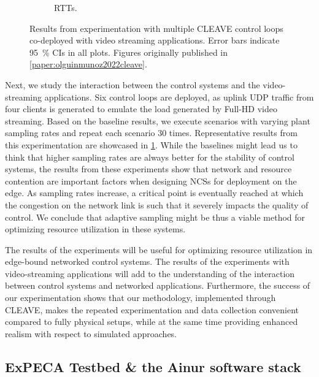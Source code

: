 \begin{figure}[t]
\begin{subfigure}[t]{.45\textwidth}
        \caption{\glspl{RTT}.}%
    \end{subfigure}%
    \caption{
        Results from experimentation with multiple \gls{CLEAVE} control loops co-deployed with video streaming applications.
        Error bars indicate \SI{95}{\percent} \glspl{CI} in all plots.
        Figures originally published in \cref{paper:olguinmunoz2022cleave}.
    }\label{fig:cleaveresults}
\end{figure}

Next, we study the interaction between the control systems and the video-streaming applications.
Six control loops are deployed, as uplink \gls{UDP} traffic from four clients is generated to emulate the load generated by Full-HD video streaming.
Based on the baseline results, we execute scenarios with varying plant sampling rates and repeat each scenario \num{30} times.
Representative results from this experimentation are showcased in \cref{fig:cleaveresults}.
While the baselines might lead us to think that higher sampling rates are always better for the stability of control systems, the results from these experiments show that network and resource contention are important factors when designing \glspl{NCS} for deployment on the edge.
As sampling rates increase, a critical point is eventually reached at which the congestion on the network link is such that it severely impacts the quality of control.
We conclude that adaptive sampling might be thus a viable method for optimizing resource utilization in these systems.

The results of the experiments will be useful for optimizing resource utilization in edge-bound networked control systems.
The results of the experiments with video-streaming applications will add to the understanding of the interaction between control systems and networked applications.
Furthermore, the success of our experimentation shows that our methodology, implemented through \gls{CLEAVE}, makes the repeated experimentation and data collection convenient compared to fully physical setups, while at the same time providing enhanced realism with respect to simulated approaches.

\subsection{ExPECA Testbed \& the Ainur software stack}

